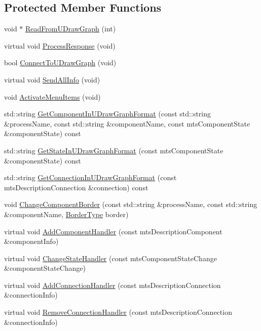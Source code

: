 \subsection*{Protected Member Functions}
\begin{DoxyCompactItemize}
\item 
void $\ast$ \hyperlink{classmts_component_viewer_aa5dd9cbc4a1d8408158e88311d3b447b}{Read\+From\+U\+Draw\+Graph} (int)
\item 
virtual void \hyperlink{classmts_component_viewer_a5adcc3b205fdb2d3b391929222137457}{Process\+Response} (void)
\item 
bool \hyperlink{classmts_component_viewer_a5ede805581fd5650f323f57ebb53eee6}{Connect\+To\+U\+Draw\+Graph} (void)
\item 
virtual void \hyperlink{classmts_component_viewer_adce96720fed764a7fc1cc9598c74b524}{Send\+All\+Info} (void)
\item 
void \hyperlink{classmts_component_viewer_ab8a3016cf3b814fff4132646c8545401}{Activate\+Menu\+Items} (void)
\item 
std\+::string \hyperlink{classmts_component_viewer_a94496c56f20040de1e87a0c36df1925a}{Get\+Component\+In\+U\+Draw\+Graph\+Format} (const std\+::string \&process\+Name, const std\+::string \&component\+Name, const mts\+Component\+State \&component\+State) const 
\item 
std\+::string \hyperlink{classmts_component_viewer_a3c1f904308cac38bf80a506eece45e8f}{Get\+State\+In\+U\+Draw\+Graph\+Format} (const mts\+Component\+State \&component\+State) const 
\item 
std\+::string \hyperlink{classmts_component_viewer_a3f1d129888db918924b042da0d84eebd}{Get\+Connection\+In\+U\+Draw\+Graph\+Format} (const mts\+Description\+Connection \&connection) const 
\item 
void \hyperlink{classmts_component_viewer_a4d5ea188a34cac5faa644618b1c55e2c}{Change\+Component\+Border} (const std\+::string \&process\+Name, const std\+::string \&component\+Name, \hyperlink{classmts_component_viewer_a2bd239a01fe3124526c4322e7305b99f}{Border\+Type} border)
\item 
virtual void \hyperlink{classmts_component_viewer_a119208a52ff869e4d7d687a04e8e1c08}{Add\+Component\+Handler} (const mts\+Description\+Component \&component\+Info)
\item 
virtual void \hyperlink{classmts_component_viewer_a1efc788ff4196c270e6e2d185b8c6104}{Change\+State\+Handler} (const mts\+Component\+State\+Change \&component\+State\+Change)
\item 
virtual void \hyperlink{classmts_component_viewer_ad9a2f2ba75fa8f47d4540ee448ba3983}{Add\+Connection\+Handler} (const mts\+Description\+Connection \&connection\+Info)
\item 
virtual void \hyperlink{classmts_component_viewer_a8ccf7105c4fa2b28f3f38fe9ea671806}{Remove\+Connection\+Handler} (const mts\+Description\+Connection \&connection\+Info)
\end{DoxyCompactItemize}
